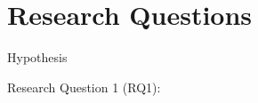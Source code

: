 \section{Research Questions}\label{sec:intro_rqs}

\begin{hypothesis}{Hypothesis}
\end{hypothesis}

\begin{mybox2}{Research Question 1 (RQ1):}
\end{mybox2}
